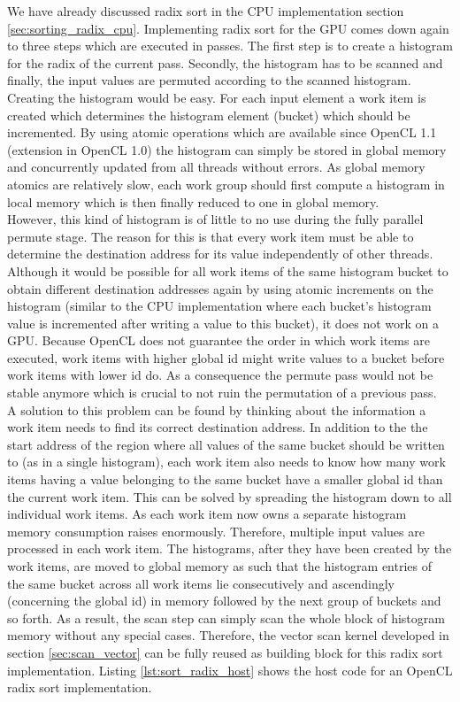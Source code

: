 We have already discussed radix sort in the CPU implementation section \ref{sec:sorting_radix_cpu}. Implementing radix sort for the GPU comes down again to three steps which are executed in passes. The first step is to create a histogram for the radix of the current pass. Secondly, the histogram has to be scanned and finally, the input values are permuted according to the scanned histogram.  \\
Creating the histogram would be easy. For each input element a work item is created which determines the histogram element (bucket) which should be incremented. By using atomic operations which are available since OpenCL 1.1 (extension in OpenCL 1.0) the histogram can simply be stored in global memory and concurrently updated from all threads without errors. As global memory atomics are relatively slow, each work group should first compute a histogram in local memory which is then finally reduced to one in global memory. \\
However, this kind of histogram is of little to no use during the fully parallel permute stage. The reason for this is that every work item must be able to determine the destination address for its value independently of other threads. Although it would be possible for all work items of the same histogram bucket to obtain different destination addresses again by using atomic increments on the histogram (similar to the CPU implementation where each bucket's histogram value is incremented after writing a value to this bucket), it does not work on a GPU. Because OpenCL does not guarantee the order in which work items are executed, work items with higher global id might write values to a bucket before work items with lower id do. As a consequence the permute pass would not be stable anymore which is crucial to not ruin the permutation of a previous pass. \\
A solution to this problem can be found by thinking about the information a work item needs to find its correct destination address. In addition to the the start address of the region where all values of the same bucket should be written to (as in a single histogram), each work item also needs to know how many work items having a value belonging to the same bucket have a smaller global id than the current work item. This can be solved by spreading the histogram down to all individual work items. As each work item now owns a separate histogram memory consumption raises enormously. Therefore, multiple input values are processed in each work item. The histograms, after they have been created by the work items, are moved to global memory as such that the histogram entries of the same bucket across all work items lie consecutively and ascendingly (concerning the global id) in memory followed by the next group of buckets and so forth. As a result, the scan step can simply scan the whole block of histogram memory without any special cases. Therefore, the vector scan kernel developed in section \ref{sec:scan_vector} can be fully reused as building block for this radix sort implementation. 
Listing \ref{lst:sort_radix_host} shows the host code for an OpenCL radix sort implementation.

